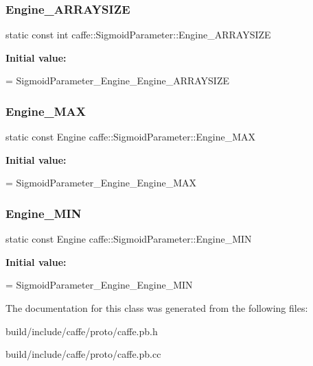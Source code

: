 \subsubsection{\texorpdfstring{Engine\+\_\+\+A\+R\+R\+A\+Y\+S\+I\+ZE}{Engine\_ARRAYSIZE}}
{\footnotesize\ttfamily static const int caffe\+::\+Sigmoid\+Parameter\+::\+Engine\+\_\+\+A\+R\+R\+A\+Y\+S\+I\+ZE\hspace{0.3cm}{\ttfamily [static]}}

{\bfseries Initial value\+:}
\begin{DoxyCode}
=
    SigmoidParameter\_Engine\_Engine\_ARRAYSIZE
\end{DoxyCode}
\mbox{\label{classcaffe_1_1_sigmoid_parameter_ae5f055a7ebf18c57ef7dd41b04923469}} 
\subsubsection{\texorpdfstring{Engine\+\_\+\+M\+AX}{Engine\_MAX}}
{\footnotesize\ttfamily static const Engine caffe\+::\+Sigmoid\+Parameter\+::\+Engine\+\_\+\+M\+AX\hspace{0.3cm}{\ttfamily [static]}}

{\bfseries Initial value\+:}
\begin{DoxyCode}
=
    SigmoidParameter\_Engine\_Engine\_MAX
\end{DoxyCode}
\mbox{\label{classcaffe_1_1_sigmoid_parameter_a10328eabd9d80c8b919fc217d3db5047}} 
\subsubsection{\texorpdfstring{Engine\+\_\+\+M\+IN}{Engine\_MIN}}
{\footnotesize\ttfamily static const Engine caffe\+::\+Sigmoid\+Parameter\+::\+Engine\+\_\+\+M\+IN\hspace{0.3cm}{\ttfamily [static]}}

{\bfseries Initial value\+:}
\begin{DoxyCode}
=
    SigmoidParameter\_Engine\_Engine\_MIN
\end{DoxyCode}


The documentation for this class was generated from the following files\+:\begin{DoxyCompactItemize}
\item 
build/include/caffe/proto/caffe.\+pb.\+h\item 
build/include/caffe/proto/caffe.\+pb.\+cc\end{DoxyCompactItemize}
